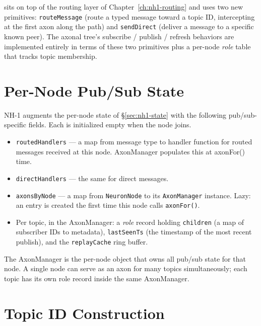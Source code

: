 \documentclass[twoside,nobib]{tufte-book}
\begin{document}
 sits on top of the routing layer
of Chapter~\ref{ch:nh1-routing} and uses two new primitives:
\texttt{routeMessage} (route a typed message toward a topic ID,
intercepting at the first axon along the path) and
\texttt{sendDirect} (deliver a message to a specific known peer).
The axonal tree's subscribe / publish / refresh behaviors are
implemented entirely in terms of these two primitives plus a
per-node \emph{role} table that tracks topic membership.

\section{Per-Node Pub/Sub State}

NH-1 augments the per-node state of \S\ref{sec:nh1-state} with the
following pub/sub-specific fields. Each is initialized empty when
the node joins.

\begin{itemize}\setlength\itemsep{0.15em}
  \item \texttt{routedHandlers} --- a map from message type to
    handler function for routed messages received at this node.
    AxonManager populates this at axonFor() time.
  \item \texttt{directHandlers} --- the same for direct messages.
  \item \texttt{axonsByNode} --- a map from \texttt{NeuronNode}
    to its \texttt{AxonManager} instance. Lazy: an entry is
    created the first time this node calls \texttt{axonFor()}.
  \item Per topic, in the AxonManager: a \emph{role} record
    holding \texttt{children} (a map of subscriber IDs to
    metadata), \texttt{lastSeenTs} (the timestamp of the most
    recent publish), and the \texttt{replayCache} ring buffer.
\end{itemize}

The AxonManager is the per-node object that owns all pub/sub
state for that node. A single node can serve as an axon for many
topics simultaneously; each topic has its own role record inside
the same AxonManager.

\section{Topic ID Construction}
\end{document}

